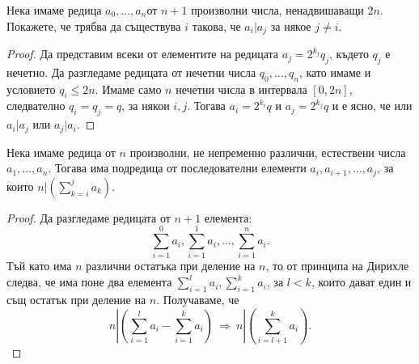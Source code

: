 \begin{problem}%
  Нека имаме редица $a_0,\dots,a_n$от $n+1$ произволни числа, ненадвишаващи $2n$.
  Покажете, че трябва да съществува $i$ такова, че $a_i\vert a_j$ за някое $j\neq i$.
\end{problem}
\begin{proof}
  Да представим всеки от елементите на редицата $a_j = 2^{k_j}q_j$, където $q_j$ е нечетно.
  Да разгледаме редицата от нечетни числа $q_0,\dots,q_n$, като имаме и условието $q_i \leq 2n$.
  Имаме само $n$ нечетни числа в интервала $[0,2n]$, следвателно $q_i = q_j = q$, за някои $i,j$.
  Тогава $a_i = 2^{k_i}q$ и $a_j = 2^{k_j}q$ и е ясно, че или $a_i\vert a_j$ или $a_j\vert a_i$.  
\end{proof}



\begin{problem}
  Нека имаме редица от $n$ произволни, не непременно различни, естествени числа $a_1,\dots,a_n$.
  Тогава има подредица от последователни елементи $a_i,a_{i+1},\dots,a_{j}$, за които
  $n | (\sum^{j}_{k=i}a_k)$.
\end{problem}
\begin{proof}
  Да разгледаме редицата от $n+1$ елемента:
  \[\sum^0_{i=1}a_i,\sum^1_{i=1}a_i,\dots,\sum^n_{i=1}a_i.\]
  Тъй като има $n$ различни остатъка при деление на $n$, то от принципа на Дирихле следва, че 
  има поне два елемента $\sum^l_{i=1}a_i, \sum^k_{i=1}a_i$, за $l<k$, които дават един и същ остатък при деление на $n$.
  Получаваме, че \[n|(\sum^l_{i=1}a_i - \sum^k_{i=1}a_i)\ \Rightarrow\ n|(\sum^k_{i=l+1}a_i).\]
\end{proof}


